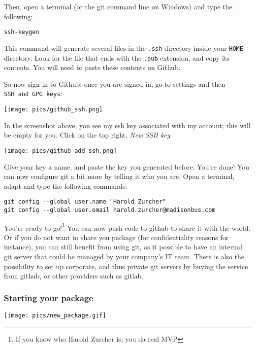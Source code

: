 \documentclass[
]{article}
\begin{document}
Then, open a terminal (or the git command line on Windows) and type the following:

\begin{verbatim}
ssh-keygen
\end{verbatim}

This command will generate several files in the \texttt{.ssh} directory inside your \texttt{HOME} directory. Look
for the file that ends with the \texttt{.pub} extension, and copy its contents. You will need to paste
these contents on Github.

So now sign in to Github; once you are signed in, go to settings and then \texttt{SSH\ and\ GPG\ keys}:

\texttt{[image: pics/github\_ssh.png]}

In the screenshot above, you see my ssh key associated with my account; this will be empty for you.
Click on the top right, \emph{New SSH key}:

\texttt{[image: pics/github\_add\_ssh.png]}

Give your key a name, and paste the key you generated before. You're done! You can now configure
git a bit more by telling it who you are. Open a terminal, adapt and type the following commands:

\begin{verbatim}
git config --global user.name "Harold Zurcher"
git config --global user.email harold.zurcher@madisonbus.com
\end{verbatim}

You're ready to go!\footnote{If you know who Harold Zurcher is, you da real MVP}
You can now push code to github to share it with the world. Or if you do not want
to share you package (for confidentiality reasons for instance), you can still benefit from using
git, as it possible to have an internal git server that could be managed by your company's IT team.
There is also the possibility to set up corporate, and thus private git servers by buying the service
from github, or other providers such as gitlab.

\hypertarget{starting-your-package}{%
\subsubsection{Starting your package}\label{starting-your-package}}

\texttt{[image: pics/new\_package.gif]}
\end{document}
